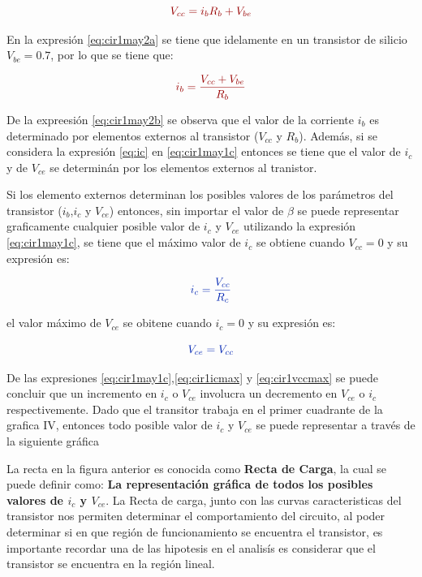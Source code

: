 \documentclass{article}
\begin{document}
\begin{equation}\label{eq:cir1may2a}
\color{red}{V_{cc}=i_{b}R_{b}+V_{be}}
\end{equation}

En la expresión \eqref{eq:cir1may2a} se tiene que idelamente en un
transistor de silicio $V_{be}=0.7$, por lo que se tiene que:

\begin{equation}\label{eq:cir1may2b}
\color{red}{i_{b}=\frac{V_{cc}+V_{be}}{R_{b}}}
\end{equation}

De la expreesión \eqref{eq:cir1may2b} se observa que el valor de la
corriente $i_{b}$ es determinado por elementos externos al transistor
($V_{cc}$ y $R_{b}$). Además, si se considera la expresión \eqref{eq:ic}
en \eqref{eq:cir1may1c} entonces se tiene que el valor de $i_{c}$ y de
$V_{ce}$ se determinán por los elementos externos al tranistor.

Si los elemento externos determinan los posibles valores de los
parámetros del transistor ($i_{b}$,$i_{c}$ y $V_{ce}$) entonces, sin
importar el valor de $\beta$ se puede representar graficamente cualquier
posible valor de $i_{c}$ y $V_{ce}$ utilizando la expresión
\eqref{eq:cir1may1c}, se tiene que el máximo valor de $i_{c}$ se obtiene
cuando $V_{cc}=0$ y su expresión es:

\begin{equation}\label{eq:cir1icmax}
\color{blue}{i_{c}=\frac{V_{cc}}{R_{c}}}
\end{equation}

el valor máximo de $V_{ce}$ se obitene cuando $i_{c}=0$ y su expresión
es:

\begin{equation}\label{eq:cir1vccmax}
\color{blue}{V_{ce}=V_{cc}}
\end{equation}

De las expresiones \eqref{eq:cir1may1c},\eqref{eq:cir1icmax} y
\eqref{eq:cir1vccmax} se puede concluir que un incremento en $i_{c}$ o
$V_{ce}$ involucra un decremento en $V_{ce}$ o $i_{c}$ respectivemente.
Dado que el transitor trabaja en el primer cuadrante de la grafica IV,
entonces todo posible valor de $i_{c}$ y $V_{ce}$ se puede representar a
través de la siguiente gráfica

La recta en la figura anterior es conocida como \textbf{Recta de Carga},
la cual se puede definir como: \textbf{La representación gráfica de
todos los posibles valores de $i_{c}$ y $V_{ce}$}. La Recta de carga,
junto con las curvas caracteristicas del transistor nos permiten
determinar el comportamiento del circuito, al poder determinar si en que
región de funcionamiento se encuentra el transistor, es importante
recordar una de las hipotesis en el analisís es considerar que el
transistor se encuentra en la región lineal.
\end{document}
